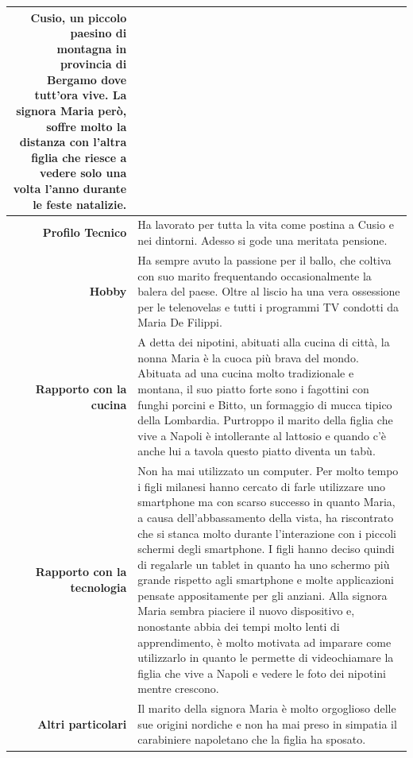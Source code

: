 \begin{table}[H]
\begin{centering}
\begin{tabular} { | r  p{10cm} | }
Cusio, un piccolo paesino di montagna in provincia di Bergamo dove
tutt'ora vive. La signora Maria però, soffre molto la distanza con
l'altra figlia che riesce a vedere solo una volta l'anno durante le
feste natalizie. \\ \hline
		\textbf{Profilo Tecnico} & Ha lavorato per tutta la vita come
postina a Cusio e nei dintorni. Adesso si gode una meritata pensione. \\ \hline
		\textbf{Hobby} & Ha sempre avuto la passione per il ballo, che
coltiva con suo marito frequentando occasionalmente la balera del paese.
Oltre al liscio ha una vera ossessione per le telenovelas e tutti i
programmi TV condotti da Maria De Filippi.  \\\hline
		\textbf{Rapporto con la cucina} & A detta dei nipotini, abituati
alla cucina di città, la nonna Maria è la cuoca
più brava del mondo. Abituata ad una cucina molto tradizionale e
montana, il suo piatto forte sono i fagottini con funghi porcini e
Bitto, un formaggio di mucca tipico della Lombardia. Purtroppo il
marito della figlia che vive a Napoli è intollerante al lattosio e
quando c'è anche lui a tavola questo piatto diventa un tabù.\\ \hline
		\textbf{Rapporto con la tecnologia} & Non ha mai utilizzato un
computer. Per molto tempo i figli milanesi hanno cercato di farle
utilizzare uno
smartphone ma con scarso successo in quanto Maria, a causa
dell'abbassamento della vista, ha riscontrato che si stanca molto
	durante l'interazione con i piccoli schermi degli smartphone. I
figli hanno deciso quindi di regalarle un tablet in quanto ha uno schermo più
grande rispetto agli smartphone e molte applicazioni pensate appositamente per gli anziani.
Alla signora Maria sembra piaciere il nuovo dispositivo e, nonostante abbia dei 
tempi molto lenti di apprendimento, è molto motivata ad
imparare come utilizzarlo in quanto le permette di
videochiamare la figlia che vive a Napoli e vedere le foto dei nipotini
mentre crescono. \\ \hline
		\textbf{Altri particolari} & Il marito della signora Maria è
molto orgoglioso delle sue origini nordiche e non ha mai preso in
simpatia il carabiniere napoletano che la figlia ha sposato. \\\hline

	\end{tabular}
	\end{centering}
\end{table}

